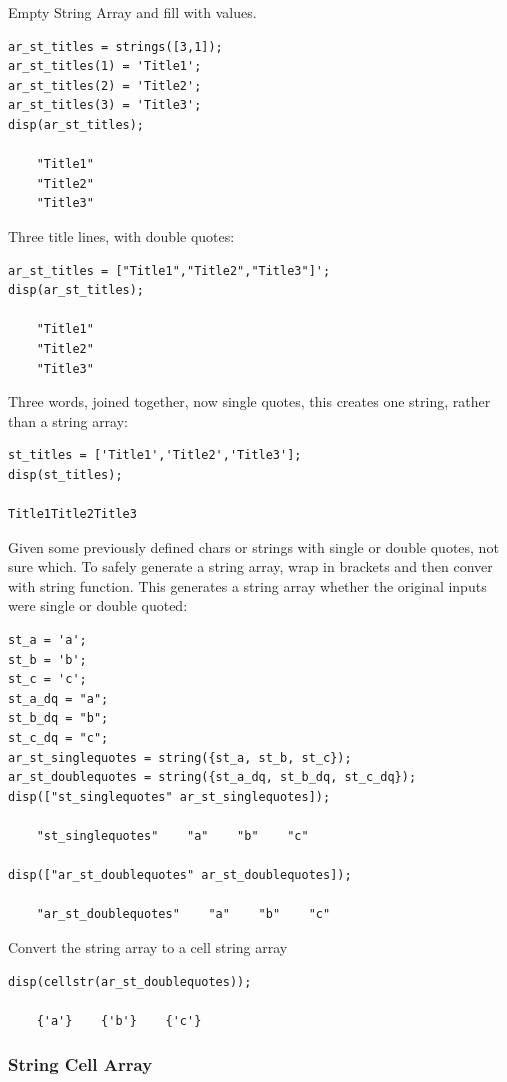 \documentclass[
]{book}
\begin{document}
Empty String Array and fill with values.

\begin{verbatim}
ar_st_titles = strings([3,1]);
ar_st_titles(1) = 'Title1';
ar_st_titles(2) = 'Title2';
ar_st_titles(3) = 'Title3';
disp(ar_st_titles);

    "Title1"
    "Title2"
    "Title3"
\end{verbatim}

Three title lines, with double quotes:

\begin{verbatim}
ar_st_titles = ["Title1","Title2","Title3"]';
disp(ar_st_titles);

    "Title1"
    "Title2"
    "Title3"
\end{verbatim}

Three words, joined together, now single quotes, this creates one
string, rather than a string array:

\begin{verbatim}
st_titles = ['Title1','Title2','Title3'];
disp(st_titles);

Title1Title2Title3
\end{verbatim}

Given some previously defined chars or strings with single or double
quotes, not sure which. To safely generate a string array, wrap in
brackets and then conver with string function. This generates a string
array whether the original inputs were single or double quoted:

\begin{verbatim}
st_a = 'a';
st_b = 'b';
st_c = 'c';
st_a_dq = "a";
st_b_dq = "b";
st_c_dq = "c";
ar_st_singlequotes = string({st_a, st_b, st_c});
ar_st_doublequotes = string({st_a_dq, st_b_dq, st_c_dq});
disp(["st_singlequotes" ar_st_singlequotes]);

    "st_singlequotes"    "a"    "b"    "c"

disp(["ar_st_doublequotes" ar_st_doublequotes]);

    "ar_st_doublequotes"    "a"    "b"    "c"
\end{verbatim}

Convert the string array to a cell string array

\begin{verbatim}
disp(cellstr(ar_st_doublequotes));

    {'a'}    {'b'}    {'c'}
\end{verbatim}

\hypertarget{string-cell-array}{%
\subsubsection{String Cell Array}\label{string-cell-array}}
\end{document}
